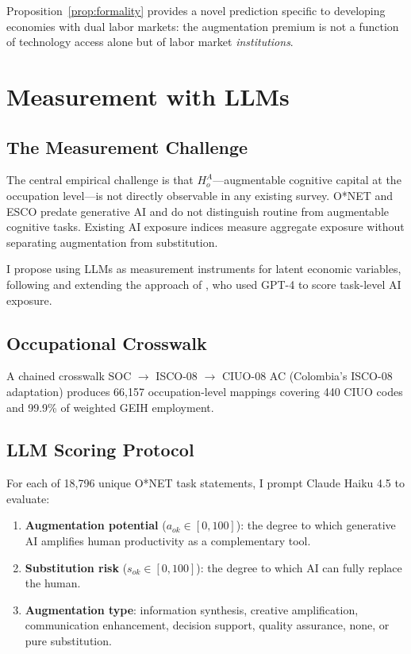 \documentclass[11pt,a4paper]{article}
\theoremstyle{definition}
\begin{document}
Proposition~\ref{prop:formality} provides a novel prediction specific to developing economies with dual labor markets: the augmentation premium is not a function of technology access alone but of labor market \textit{institutions}.


\section{Measurement with LLMs}
\label{sec:measurement}

\subsection{The Measurement Challenge}

The central empirical challenge is that $H_o^A$---augmentable cognitive capital at the occupation level---is not directly observable in any existing survey. O*NET and ESCO predate generative AI and do not distinguish routine from augmentable cognitive tasks. Existing AI exposure indices \citep{felten2021occupational, webb2020impact} measure aggregate exposure without separating augmentation from substitution.

I propose using LLMs as measurement instruments for latent economic variables, following and extending the approach of \citet{eloundou2024gpts}, who used GPT-4 to score task-level AI exposure.

\subsection{Occupational Crosswalk}

A chained crosswalk SOC $\to$ ISCO-08 $\to$ CIUO-08 AC (Colombia's ISCO-08 adaptation) produces 66,157 occupation-level mappings covering 440 CIUO codes and 99.9\% of weighted GEIH employment.

\subsection{LLM Scoring Protocol}

For each of 18,796 unique O*NET task statements, I prompt Claude Haiku 4.5 \citep{anthropic2025} to evaluate:
\begin{enumerate}[leftmargin=*]
\item \textbf{Augmentation potential} ($a_{ok} \in [0, 100]$): the degree to which generative AI amplifies human productivity as a complementary tool.
\item \textbf{Substitution risk} ($s_{ok} \in [0, 100]$): the degree to which AI can fully replace the human.
\item \textbf{Augmentation type}: information synthesis, creative amplification, communication enhancement, decision support, quality assurance, none, or pure substitution.
\end{enumerate}
\end{document}

